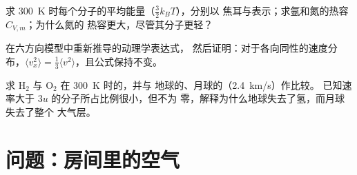 \begin{exercise}[$\star\star\star$]\label{exo:b1:kinetic-theory:10}
求 \qty{300}{K} 时每个分子的平均能量（$\tfrac32 k_BT$），分别以
焦耳与表示；求氩和氮的热容 $C_{V,m}$；为什么氮的
热容更大，尽管其分子更轻？
\end{exercise}

\begin{exercise}[$\star\star\star$]\label{exo:b1:kinetic-theory:11}
在六方向模型中重新推导的动理学表达式，
然后证明：对于各向同性的速度分布，$\langle v_x^2\rangle
= \tfrac13\langle v^2\rangle$，且公式保持不变。
\end{exercise}

\begin{exercise}[$\star\star\star$]\label{exo:b1:kinetic-theory:12}
求 H$_2$ 与 O$_2$ 在 \qty{300}{K} 时的，并与
地球的、月球的（\qty{2.4}{km/s}）作比较。
已知速率大于 $3u$ 的分子所占比例很小，但不为
零，解释为什么地球失去了氢，而月球失去了整个
大气层。
\end{exercise}

\section{问题：房间里的空气}

